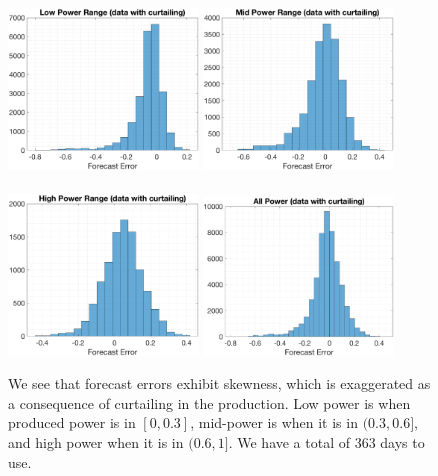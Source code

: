 \documentclass[11pt]{article}
\theoremstyle{definition}
\begin{document}
\begin{figure}[H]
\centering
\includegraphics[width=0.45\textwidth]{plots/LP_6.eps}
\includegraphics[width=0.45\textwidth]{plots/MP_6.eps}\\
\quad\\
\includegraphics[width=0.45\textwidth]{plots/HP_6.eps}
\includegraphics[width=0.45\textwidth]{plots/AP_6.eps}
\caption{We see that forecast errors exhibit skewness, which is exaggerated as a consequence of curtailing in the production. Low power is when produced power is in $[0,0.3]$, mid-power is when it is in $(0.3,0.6]$, and high power when it is in $(0.6,1]$. We have a total of 363 days to use.}
  \label{fig:data_curtailing}
\end{figure}
\end{document}
